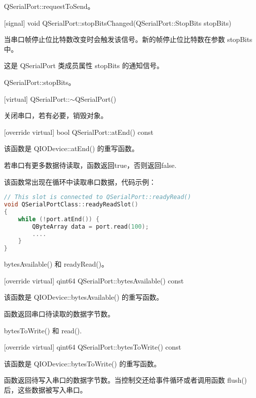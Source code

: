 \begin{seeAlso}
QSerialPort::requestToSend。
\end{seeAlso}

[signal] void QSerialPort::stopBitsChanged(QSerialPort::StopBits stopBits)

当串口帧停止位比特数改变时会触发该信号。新的帧停止位比特数在参数 stopBits 中。

\begin{notice}
这是 QSerialPort 类成员属性 stopBits 的通知信号。
\end{notice}

\begin{seeAlso}
QSerialPort::stopBits。
\end{seeAlso}

[virtual] QSerialPort::$\sim$QSerialPort()

关闭串口，若有必要，销毁对象。

[override virtual] bool QSerialPort::atEnd() const

该函数是 QIODevice::atEnd() 的重写函数。

若串口有更多数据待读取，函数返回true，否则返回false.

该函数常出现在循环中读取串口数据，代码示例：

\begin{lstlisting}[language=C++]
// This slot is connected to QSerialPort::readyRead()
void QSerialPortClass::readyReadSlot()
{
    while (!port.atEnd()) {
        QByteArray data = port.read(100);
        ....
    }
}
\end{lstlisting}

\begin{seeAlso}
bytesAvailable() 和 readyRead()。
\end{seeAlso}

[override virtual] qint64 QSerialPort::bytesAvailable() const

该函数是 QIODevice::bytesAvailable() 的重写函数。

函数返回串口待读取的数据字节数。

\begin{seeAlso}
bytesToWrite() 和 read().
\end{seeAlso}

[override virtual] qint64 QSerialPort::bytesToWrite() const

该函数是 QIODevice::bytesToWrite() 的重写函数。

函数返回待写入串口的数据字节数。当控制交还给事件循环或者调用函数 flush() 后，这些数据被写入串口。

